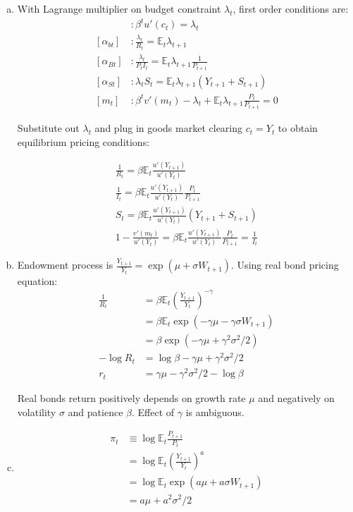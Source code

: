 \documentclass{article}
\newcommand{\E}{\mathbb{E}}
\begin{document}
\begin{enumerate}[(a)]
\item With Lagrange multiplier on budget constraint $\lambda_t$, first
  order conditions are:
  \begin{align*}
    [c_t]&:\beta^tu'(c_t)=\lambda_t\\
    [\alpha_{bt}]&:\frac{\lambda_t}{R_t}=\E_t\lambda_{t+1}\\
    [\alpha_{Bt}]&:\frac{\lambda_t}{P_tI_t}=\E_t\lambda_{t+1}\frac{1}{P_{t+1}}\\
    [\alpha_{St}]&:\lambda_tS_t=\E_t\lambda_{t+1}(Y_{t+1}+S_{t+1})\\
    [m_t]&:\beta^tv'(m_t)-\lambda_t+\E_t\lambda_{t+1}\frac{P_t}{P_{t+1}}=0
  \end{align*}

  Substitute out $\lambda_t$ and plug in goods market clearing
  $c_t=Y_t$ to obtain equilibrium pricing conditions:

  \begin{gather*}
    \frac{1}{R_t}=\beta\E_t\frac{u'(Y_{t+1})}{u'(Y_t)}\\
    \frac{1}{I_t}=\beta\E_t\frac{u'(Y_{t+1})}{u'(Y_t)}\frac{P_t}{P_{t+1}}\\
    S_t=\beta\E_t\frac{u'(Y_{t+1})}{u'(Y_t)}(Y_{t+1}+S_{t+1})\\
    1-\frac{v'(m_t)}{u'(Y_t)}=\beta\E_t\frac{u'(Y_{t+1})}{u'(Y_t)}\frac{P_t}{P_{t+1}}=\frac{1}{I_t}
  \end{gather*}

\item Endowment process is
  $\frac{Y_{t+1}}{Y_t}=\exp(\mu+\sigma W_{t+1})$. Using real bond
  pricing equation:
  \begin{align*}
    \frac{1}{R_t}&=\beta\E_t\left(\frac{Y_{t+1}}{Y_t}\right)^{-\gamma}\\
                 &=\beta\E_t\exp(-\gamma\mu-\gamma\sigma W_{t+1})\\
                 &=\beta\exp(-\gamma\mu+\gamma^2\sigma^2/2)\\
    -\log R_t&=\log\beta-\gamma\mu+\gamma^2\sigma^2/2\\
    r_t&=\gamma\mu-\gamma^2\sigma^2/2-\log\beta
  \end{align*}

  Real bonds return positively depends on growth rate $\mu$ and
  negatively on volatility $\sigma$ and patience $\beta$. Effect of
  $\gamma$ is ambiguous.
  
\item
  \begin{align*}
    \pi_t&\equiv\log\E_t\frac{P_{t+1}}{P_{t}}\\
         &=\log\E_t\left(\frac{Y_{t+1}}{Y_t}\right)^a\\
         &=\log\E_t\exp(a\mu+a\sigma W_{t+1})\\
         &=a\mu+a^2\sigma^2/2
  \end{align*}


\end{enumerate}
\end{document}
